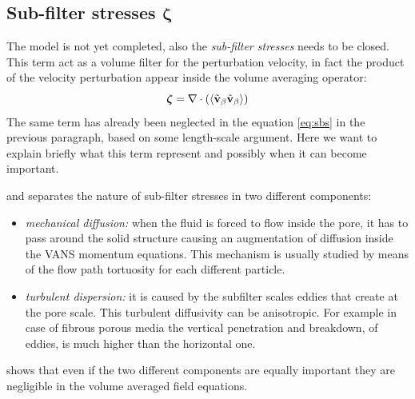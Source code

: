 \subsection{Sub-filter stresses $\boldsymbol{\zeta}$}

The model is not yet completed, also the \textit{sub-filter stresses} needs to be closed. This term act as a volume filter for the perturbation velocity, in fact the product of the velocity perturbation appear inside the volume averaging operator:
$$\boldsymbol{\zeta} = \nabla \cdot \left({\left< \tilde{\textbf{v}}_{\beta} \tilde{\textbf{v}}_{\beta} \right>}\right)$$
The same term has already been neglected in the equation \eqref{eq:sbs} in the previous paragraph, based on some length-scale argument.  Here we want to explain briefly what this term represent and possibly when it can become important.

\citet{breugem2006influence} and \citet{nepf1999drag} separates the nature of sub-filter stresses in two different components:
\begin{itemize}
	\item \textit{mechanical diffusion:} when the fluid is forced to flow inside the pore, it has to pass around the solid structure causing an augmentation of diffusion inside the VANS momentum equations. This mechanism is usually studied by means of the flow path tortuosity for each different particle.
	\item \textit{turbulent dispersion:} it is caused by the subfilter scales eddies that create at the pore scale. This turbulent diffusivity can be anisotropic. For example in case of fibrous porous media the vertical penetration and breakdown, of eddies, is much higher than the horizontal one.
\end{itemize}

\citet{breugem2006influence} shows that even if the two different components are equally important they are negligible in the volume averaged field equations.

%


